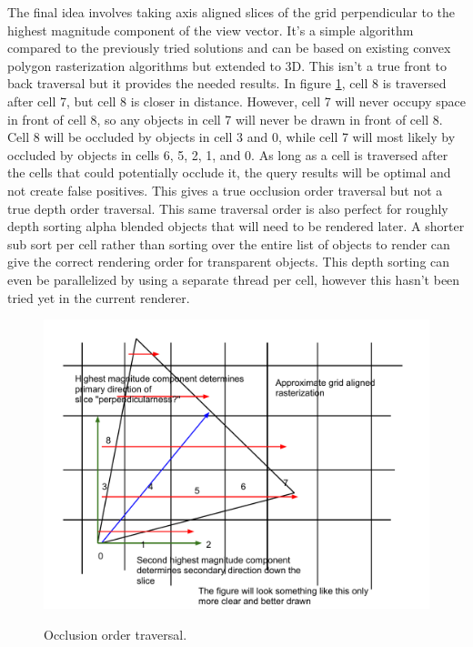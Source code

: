 \documentclass[12pt]{ucthesis}
\newcommand{\captionfonts}{\small\bf\ssp}
\begin{document}
The final idea involves taking axis aligned slices of the grid perpendicular to the highest magnitude component of the view vector.
It's a simple algorithm compared to the previously tried solutions and can be based on existing convex polygon rasterization algorithms but extended to 3D.
This isn't a true front to back traversal but it provides the needed results.
In figure \ref{fig:frustum-iter}, cell 8 is traversed after cell 7, but cell 8 is closer in distance.
However, cell 7 will never occupy space in front of cell 8, so any objects in cell 7 will never be drawn in front of cell 8.
Cell 8 will be occluded by objects in cell 3 and 0, while cell 7 will most likely by occluded by objects in cells 6, 5, 2, 1, and 0.
As long as a cell is traversed after the cells that could potentially occlude it, the query results will be optimal and not create false positives.
This gives a true occlusion order traversal but not a true depth order traversal.
This same traversal order is also perfect for roughly depth sorting alpha blended objects that will need to be rendered later.
A shorter sub sort per cell rather than sorting over the entire list of objects to render can give the correct rendering order for transparent objects.
This depth sorting can even be parallelized by using a separate thread per cell, however this hasn't been tried yet in the current renderer.

\begin{figure}
\begin{center}
\includegraphics[width=\textwidth]{Images/frustum-iter.pdf}
\captionfonts
\caption[View Frustum Traversal]{Occlusion order traversal.}
\label{fig:frustum-iter}
\end{center}
\end{figure}
\end{document}
